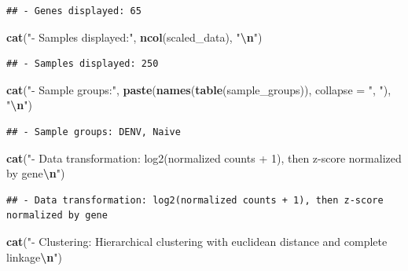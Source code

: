 \documentclass[
]{article}
\newenvironment{Shaded}{\begin{snugshade}}{\end{snugshade}}
\newcommand{\AttributeTok}[1]{\textcolor[rgb]{0.13,0.29,0.53}{#1}}
\newcommand{\FunctionTok}[1]{\textcolor[rgb]{0.13,0.29,0.53}{\textbf{#1}}}
\newcommand{\NormalTok}[1]{#1}
\newcommand{\SpecialCharTok}[1]{\textcolor[rgb]{0.81,0.36,0.00}{\textbf{#1}}}
\newcommand{\StringTok}[1]{\textcolor[rgb]{0.31,0.60,0.02}{#1}}
\begin{document}
\begin{verbatim}
## - Genes displayed: 65
\end{verbatim}

\begin{Shaded}
\begin{Highlighting}[]
\FunctionTok{cat}\NormalTok{(}\StringTok{"{-} Samples displayed:"}\NormalTok{, }\FunctionTok{ncol}\NormalTok{(scaled\_data), }\StringTok{"}\SpecialCharTok{\textbackslash{}n}\StringTok{"}\NormalTok{)}
\end{Highlighting}
\end{Shaded}

\begin{verbatim}
## - Samples displayed: 250
\end{verbatim}

\begin{Shaded}
\begin{Highlighting}[]
\FunctionTok{cat}\NormalTok{(}\StringTok{"{-} Sample groups:"}\NormalTok{, }\FunctionTok{paste}\NormalTok{(}\FunctionTok{names}\NormalTok{(}\FunctionTok{table}\NormalTok{(sample\_groups)), }\AttributeTok{collapse =} \StringTok{", "}\NormalTok{), }\StringTok{"}\SpecialCharTok{\textbackslash{}n}\StringTok{"}\NormalTok{)}
\end{Highlighting}
\end{Shaded}

\begin{verbatim}
## - Sample groups: DENV, Naive
\end{verbatim}

\begin{Shaded}
\begin{Highlighting}[]
\FunctionTok{cat}\NormalTok{(}\StringTok{"{-} Data transformation: log2(normalized counts + 1), then z{-}score normalized by gene}\SpecialCharTok{\textbackslash{}n}\StringTok{"}\NormalTok{)}
\end{Highlighting}
\end{Shaded}

\begin{verbatim}
## - Data transformation: log2(normalized counts + 1), then z-score normalized by gene
\end{verbatim}

\begin{Shaded}
\begin{Highlighting}[]
\FunctionTok{cat}\NormalTok{(}\StringTok{"{-} Clustering: Hierarchical clustering with euclidean distance and complete linkage}\SpecialCharTok{\textbackslash{}n}\StringTok{"}\NormalTok{)}
\end{Highlighting}
\end{Shaded}
\end{document}
